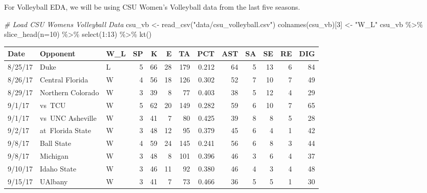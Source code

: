 \documentclass[
  11pt,
]{book}
\newenvironment{Shaded}{\begin{snugshade}}{\end{snugshade}}
\newcommand{\AttributeTok}[1]{\textcolor[rgb]{0.77,0.63,0.00}{#1}}
\newcommand{\CommentTok}[1]{\textcolor[rgb]{0.56,0.35,0.01}{\textit{#1}}}
\newcommand{\DecValTok}[1]{\textcolor[rgb]{0.00,0.00,0.81}{#1}}
\newcommand{\FunctionTok}[1]{\textcolor[rgb]{0.00,0.00,0.00}{#1}}
\newcommand{\NormalTok}[1]{#1}
\newcommand{\OtherTok}[1]{\textcolor[rgb]{0.56,0.35,0.01}{#1}}
\newcommand{\SpecialCharTok}[1]{\textcolor[rgb]{0.00,0.00,0.00}{#1}}
\newcommand{\StringTok}[1]{\textcolor[rgb]{0.31,0.60,0.02}{#1}}
\theoremstyle{definition}
\theoremstyle{definition}
\theoremstyle{definition}
\theoremstyle{definition}
\theoremstyle{remark}
\begin{document}
For Volleyball EDA, we will be using CSU Women's Volleyball data from the last five seasons.

\begin{Shaded}
\begin{Highlighting}[]
\CommentTok{\# Load CSU Women\textquotesingle{}s Volleyball Data}
\NormalTok{csu\_vb }\OtherTok{\textless{}{-}} \FunctionTok{read\_csv}\NormalTok{(}\StringTok{"data/csu\_volleyball.csv"}\NormalTok{)}
\FunctionTok{colnames}\NormalTok{(csu\_vb)[}\DecValTok{3}\NormalTok{] }\OtherTok{\textless{}{-}} \StringTok{"W\_L"}
\NormalTok{csu\_vb }\SpecialCharTok{\%\textgreater{}\%} \FunctionTok{slice\_head}\NormalTok{(}\AttributeTok{n=}\DecValTok{10}\NormalTok{) }\SpecialCharTok{\%\textgreater{}\%} \FunctionTok{select}\NormalTok{(}\DecValTok{1}\SpecialCharTok{:}\DecValTok{13}\NormalTok{) }\SpecialCharTok{\%\textgreater{}\%} \FunctionTok{kt}\NormalTok{()}
\end{Highlighting}
\end{Shaded}

\begin{table}[H]
\centering
\begin{tabular}{lllrrrrrrrrrr}
\toprule
Date & Opponent & W\_L & SP & K & E & TA & PCT & AST & SA & SE & RE & DIG\\
\midrule
8/25/17 & Duke & L & 5 & 66 & 28 & 179 & 0.212 & 64 & 5 & 13 & 6 & 84\\
8/26/17 & Central Florida & W & 4 & 56 & 18 & 126 & 0.302 & 52 & 7 & 10 & 7 & 49\\
8/29/17 & Northern Colorado & W & 3 & 39 & 8 & 77 & 0.403 & 38 & 5 & 12 & 4 & 29\\
9/1/17 & vs TCU & W & 5 & 62 & 20 & 149 & 0.282 & 59 & 6 & 10 & 7 & 65\\
9/1/17 & vs UNC Asheville & W & 3 & 41 & 7 & 80 & 0.425 & 39 & 8 & 8 & 5 & 28\\
9/2/17 & at Florida State & W & 3 & 48 & 12 & 95 & 0.379 & 45 & 6 & 4 & 1 & 42\\
9/8/17 & Ball State & W & 4 & 59 & 24 & 145 & 0.241 & 56 & 6 & 8 & 3 & 44\\
9/8/17 & Michigan & W & 3 & 48 & 8 & 101 & 0.396 & 46 & 3 & 6 & 4 & 37\\
9/10/17 & Idaho State & W & 3 & 46 & 11 & 92 & 0.380 & 46 & 4 & 3 & 4 & 48\\
9/15/17 & UAlbany & W & 3 & 41 & 7 & 73 & 0.466 & 36 & 5 & 5 & 1 & 30\\
\bottomrule
\end{tabular}
\end{table}
\end{document}
